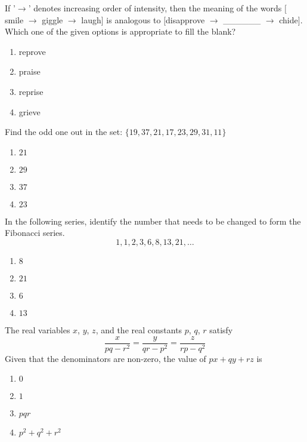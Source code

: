 
\iffalse
\chapter{2024}
\author{EE24BTECH11004}
\section{me}
\fi

\item If '$\to$' denotes increasing order of intensity, then the meaning of the words 
$[$smile $\to$ giggle $\to$ laugh$]$ is analogous to $[$disapprove $\to$ \_\_\_\_\_\_ $\to$ chide$]$. 
Which one of the given options is appropriate to fill the blank?
\begin{enumerate}
    \item reprove
    \item praise
    \item reprise
    \item grieve
\end{enumerate}

\item Find the odd one out in the set: $\{19, 37, 21, 17, 23, 29, 31, 11\}$
\begin{enumerate}
    \item $21$
    \item $29$
    \item $37$
    \item $23$
\end{enumerate}
\item In the following series, identify the number that needs to be changed to form the Fibonacci series. 
\[
1, 1, 2, 3, 6, 8, 13, 21, \dots
\]
\begin{enumerate}
    \item $8$
    \item $21$
    \item $6$
    \item $13$
\end{enumerate}

\item The real variables $x$, $y$, $z$, and the real constants $p$, $q$, $r$ satisfy
\[
\frac{x}{pq - r^2} = \frac{y}{qr - p^2} = \frac{z}{rp - q^2}
\]
Given that the denominators are non-zero, the value of $px + qy + rz$ is
\begin{enumerate}
    \item $0$
    \item $1$
    \item $pqr$
    \item $p^2 + q^2 + r^2$
\end{enumerate}

